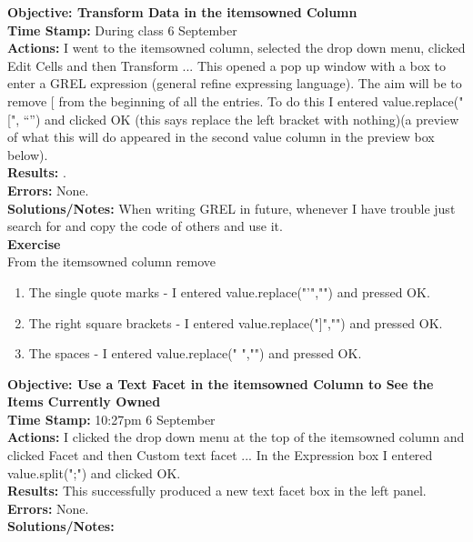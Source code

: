\documentclass{article}
\begin{document}
\begin{FlushLeft}
\vspace{5mm}
\textbf{Objective: Transform Data in the items\textunderscore owned Column}\\ 
\textbf{Time Stamp:} During class 6 September\\
\textbf{Actions:} I went to the items\textunderscore owned column, selected the drop down menu, clicked Edit Cells and then Transform ... This opened a pop up window with a box to enter a GREL expression (general refine expressing language). The aim will be to remove [ from the beginning of all the entries. To do this I entered value.replace("[", “”) and clicked OK (this says  replace the left bracket with nothing)(a preview of what this will do appeared in the second value column in the preview box below).\\
\textbf{Results:} . \\
\textbf{Errors:} None.\\
\textbf{Solutions/Notes:} When writing GREL in future, whenever I have trouble just search for and copy the code of others and use it.\\
\vspace{5mm}
\textbf{Exercise}\\ 
From the items\textunderscore owned column remove
\begin{enumerate}
    \item The single quote marks - I entered value.replace("'","") and pressed OK.
    \item The right square brackets - I entered value.replace("]","") and pressed OK.
    \item The spaces - I entered value.replace(" ","") and pressed OK.
\end{enumerate}
\vspace{5mm}
\textbf{Objective: Use a Text Facet in the items\textunderscore owned Column to See the Items Currently Owned}\\ 
\textbf{Time Stamp:} 10:27pm 6 September\\
\textbf{Actions:} I clicked the drop down menu at the top of the items\textunderscore owned column and clicked Facet and then Custom text facet ... In the Expression box I entered value.split(";") and clicked OK.\\
\textbf{Results:} This successfully produced a new text facet box in the left panel.\\
\textbf{Errors:} None.\\
\textbf{Solutions/Notes:}\\
\vspace{5mm}

\end{FlushLeft}
\end{document}
